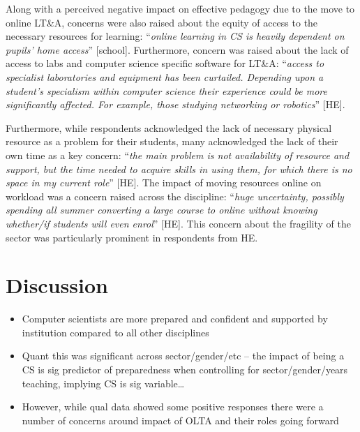 \documentclass[sigconf]{acmart}
\begin{document}
Along with a perceived negative impact on effective pedagogy due to
the move to online LT\&A, concerns were also raised about the equity
of access to the necessary resources for learning: ``{\emph{online learning in
CS is heavily dependent on pupils' home access}}'' [school]. Furthermore,
concern was raised about the lack of access to labs and computer
science specific software for LT\&A: ``{\emph{access to specialist
laboratories and equipment has been curtailed. Depending upon a
student’s specialism within computer science their experience could be
more significantly affected. For example, those studying networking or
robotics}}'' [HE].

Furthermore, while respondents acknowledged the lack of necessary
physical resource as a problem for their students, many acknowledged
the lack of their own time as a key concern: ``{\emph{the main problem
is not availability of resource and support, but the time needed to
acquire skills in using them, for which there is no space in my
current role}}'' [HE]. The impact of moving resources online on
workload was a concern raised across the discipline: ``{\emph{huge
uncertainty, possibly spending all summer converting a large course to
online without knowing whether/if students will even enrol}}''
[HE]. This concern about the fragility of the sector was particularly
prominent in respondents from HE.

\section{Discussion}\label{discussion}

\begin{itemize}
\item Computer scientists are more prepared and confident and
supported by institution compared to all other disciplines
\item Quant this was significant across sector/gender/etc – the impact
of being a CS is sig predictor of preparedness when controlling for
sector/gender/years teaching, implying CS is sig variable…
\item However, while qual data showed some positive responses there
were a number of concerns around impact of OLTA and their roles going
forward
\end{itemize}
\end{document}
